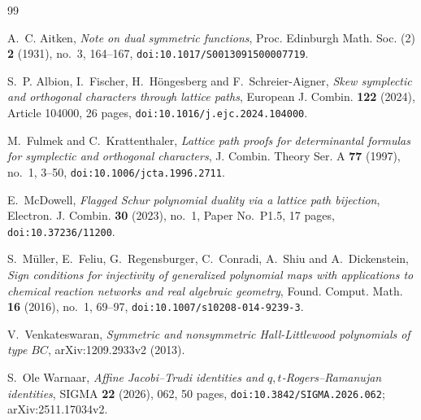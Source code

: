 \documentclass[12pt]{article}
\numberwithin{equation}{section}
\begin{document}
\begin{thebibliography}{99}
\raggedright

A.~C. Aitken,
\emph{Note on dual symmetric functions},
Proc. Edinburgh Math. Soc. (2) \textbf{2} (1931), no.~3, 164--167,
\texttt{doi:10.1017/S0013091500007719}.

S.~P. Albion, I.~Fischer, H.~H\"ongesberg and F.~Schreier-Aigner,
\emph{Skew symplectic and orthogonal characters through lattice paths},
European J. Combin. \textbf{122} (2024), Article 104000, 26 pages,
\texttt{doi:10.1016/j.ejc.2024.104000}.

M.~Fulmek and C.~Krattenthaler,
\emph{Lattice path proofs for determinantal formulas for symplectic and
orthogonal characters},
J. Combin. Theory Ser. A \textbf{77} (1997), no.~1, 3--50,
\texttt{doi:10.1006/jcta.1996.2711}.

E.~McDowell,
\emph{Flagged Schur polynomial duality via a lattice path bijection},
Electron. J. Combin. \textbf{30} (2023), no.~1, Paper No.~P1.5, 17 pages,
\texttt{doi:10.37236/11200}.

S.~M\"uller, E.~Feliu, G.~Regensburger, C.~Conradi, A.~Shiu and
A.~Dickenstein,
\emph{Sign conditions for injectivity of generalized polynomial maps with
applications to chemical reaction networks and real algebraic geometry},
Found. Comput. Math. \textbf{16} (2016), no.~1, 69--97,
\texttt{doi:10.1007/s10208-014-9239-3}.

V.~Venkateswaran,
\emph{Symmetric and nonsymmetric Hall-Littlewood polynomials of type
$BC$},
arXiv:1209.2933v2 (2013).

S.~Ole Warnaar,
\emph{Affine Jacobi--Trudi identities and $q,t$-Rogers--Ramanujan identities},
SIGMA \textbf{22} (2026), 062, 50 pages,
\texttt{doi:10.3842/SIGMA.2026.062}; arXiv:2511.17034v2.

\end{thebibliography}
\end{document}
